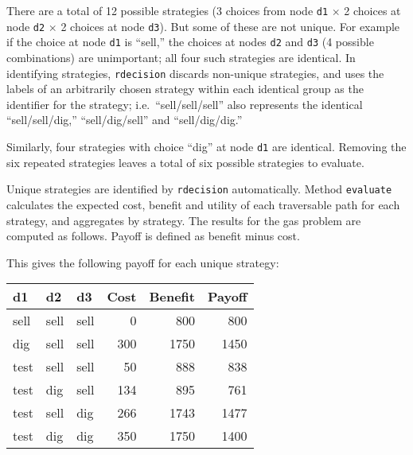 \documentclass[
]{article}
\newenvironment{Shaded}{\begin{snugshade}}{\end{snugshade}}
\newcommand{\CommentTok}[1]{\textcolor[rgb]{0.56,0.35,0.01}{\textit{#1}}}
\newcommand{\FunctionTok}[1]{\textcolor[rgb]{0.00,0.00,0.00}{#1}}
\newcommand{\NormalTok}[1]{#1}
\newcommand{\OtherTok}[1]{\textcolor[rgb]{0.56,0.35,0.01}{#1}}
\newcommand{\SpecialCharTok}[1]{\textcolor[rgb]{0.00,0.00,0.00}{#1}}
\begin{document}
There are a total of 12 possible strategies (3 choices from node
\texttt{d1} \(\times\) 2 choices at node \texttt{d2} \(\times\) 2
choices at node \texttt{d3}). But some of these are not unique. For
example if the choice at node \texttt{d1} is ``sell,'' the choices at
nodes \texttt{d2} and \texttt{d3} (4 possible combinations) are
unimportant; all four such strategies are identical. In identifying
strategies, \texttt{rdecision} discards non-unique strategies, and uses
the labels of an arbitrarily chosen strategy within each identical group
as the identifier for the strategy; i.e.~``sell/sell/sell'' also
represents the identical ``sell/sell/dig,'' ``sell/dig/sell'' and
``sell/dig/dig.''

Similarly, four strategies with choice ``dig'' at node \texttt{d1} are
identical. Removing the six repeated strategies leaves a total of six
possible strategies to evaluate.

Unique strategies are identified by \texttt{rdecision} automatically.
Method \texttt{evaluate} calculates the expected cost, benefit and
utility of each traversable path for each strategy, and aggregates by
strategy. The results for the gas problem are computed as follows.
Payoff is defined as benefit minus cost.

\begin{Shaded}
\end{Shaded}

This gives the following payoff for each unique strategy:

\begin{longtable}[]{@{}lllrrr@{}}
\toprule
d1 & d2 & d3 & Cost & Benefit & Payoff\tabularnewline
\midrule
\endhead
sell & sell & sell & 0 & 800 & 800\tabularnewline
dig & sell & sell & 300 & 1750 & 1450\tabularnewline
test & sell & sell & 50 & 888 & 838\tabularnewline
test & dig & sell & 134 & 895 & 761\tabularnewline
test & sell & dig & 266 & 1743 & 1477\tabularnewline
test & dig & dig & 350 & 1750 & 1400\tabularnewline
\bottomrule
\end{longtable}
\end{document}
